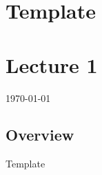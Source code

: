 \documentclass[12pt]{article}
\begin{document}
{\centering
\section*{Template}
\section*{Lecture 1}
\indent\today
}

\subsection*{Overview}
Template
\end{document}
